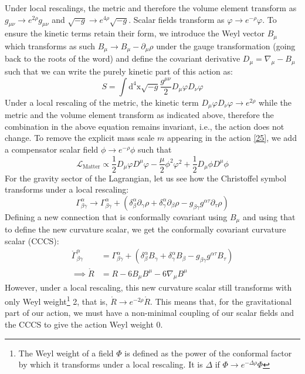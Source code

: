 \documentclass[aps,prd,reprint,preprintnumbers,showpacs,floatfix,nofootinbib,superscript address]{revtex4-2}
\begin{document}
Under local rescalings, the metric and therefore the volume element transform as $g_{\mu\nu} \rightarrow e^{2\rho} g_{\mu\nu} $ and $\sqrt{-g} \rightarrow e^{4\rho} \sqrt{-g}$. Scalar fields transform as $\varphi \rightarrow e^{-\rho}\varphi$. To ensure the kinetic terms retain their form, we introduce the Weyl vector $B_\mu$ which transforms as such $B_{\mu} \rightarrow B_\mu - \partial_\mu \rho$ under the gauge transformation (going back to the roots of the word) and define the covariant derivative $D_\mu = \nabla_\mu - B_\mu$ such that we can write the purely kinetic part of this action as:
\[
    S = \int \text{d}^4 \text{x} \sqrt{-g} \frac{g^{\mu\nu}}{2} D_\mu \varphi D_\nu \varphi
\]
Under a local rescaling of the metric, the kinetic term $D_\mu \varphi D_\nu \varphi \rightarrow e^{2\rho}$ while the metric and the volume element transform as indicated above, therefore the combination in the above equation remains invariant, i.e., the action does not change. To remove the explicit mass scale $m$ appearing in the action \ref{25}, we add a compensator scalar field $\phi \rightarrow e^{-\rho}\phi$ such that
\[
\mathcal{L}_\text{Matter} \propto \frac{1}{2} D_\mu \varphi D^\mu \varphi - \frac{\mu}{2} \phi^2 \varphi^2 + \frac{1}{2} D_\mu \phi D^\mu \phi 
\]
For the gravity sector of the Lagrangian, let us see how the Christoffel symbol transforms under a local rescaling:
\[
    \Gamma^{\alpha}_{\beta \gamma} \rightarrow \Gamma^{\alpha}_{\beta \gamma} +(\delta^{\alpha}_{\beta} \partial_\gamma \rho + \delta^{\alpha}_{\gamma} \partial_{\beta} \rho - g_{\beta \gamma}g^{\alpha \tau}\partial_{\tau}\rho)
\]
Defining a new connection that is conformally covariant using $B_\mu$ and using that to define the new curvature scalar, we get the conformally covariant curvature scalar (CCCS):
\begin{align}
    \mathring{\Gamma}^{\alpha}_{\beta \gamma} &= \Gamma^{\alpha}_{\beta \gamma} + (\delta^{\alpha}_{\beta} B_{\gamma} + \delta^{\alpha}_{\gamma} B_{\beta} - g_{\beta \gamma}g^{\alpha \tau}B_{\tau}) \nonumber \\
    \implies \mathring{R} &= R - 6 B_{\mu} B^{\mu} - 6 \nabla_\mu B^\mu
\end{align}
However, under a local rescaling, this new curvature scalar still transforms with only Weyl weight\footnote{The Weyl weight of a field $\Phi$ is defined as the power of the conformal factor by which it transforms under a local rescaling. It is $\Delta$ if $\Phi \rightarrow e^{-\Delta\rho}\Phi$} 2, that is, $\mathring{R} \rightarrow e^{-2\rho} \mathring{R}$. This means that, for the gravitational part of our action, we must have a non-minimal coupling of our scalar fields and the CCCS to give the action Weyl weight 0.
\end{document}
